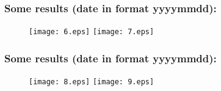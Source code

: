 \documentclass[aspectratio=169]{beamer}\usepackage[utf8]{inputenc}
\begin{document}
\begin{frame}\frametitle{Some results (date in format yyyymmdd):}
\begin{figure}[ht!]
\centering
{\texttt{[image: 6.eps]}}\quad
{\texttt{[image: 7.eps]}}
\end{figure}
\end{frame}

\begin{frame}\frametitle{Some results (date in format yyyymmdd):}
\begin{figure}[ht!]
\centering
{\texttt{[image: 8.eps]}}\quad
{\texttt{[image: 9.eps]}}
\end{figure}
\end{frame}
\end{document}
